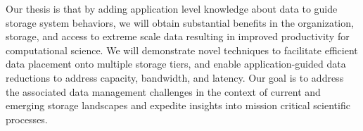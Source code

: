 Our thesis is that by adding application level knowledge about data to guide
storage system behaviors, we will obtain substantial benefits in the
organization, storage, and access to extreme scale data resulting in
improved productivity for computational science. We will demonstrate novel
techniques to facilitate efficient data placement onto multiple storage
tiers, and enable application-guided data reductions to address capacity,
bandwidth, and latency. Our goal is to address the associated data management
challenges in the context of current and emerging storage landscapes and
expedite insights into mission critical scientific processes.

\noindent

\vfill

